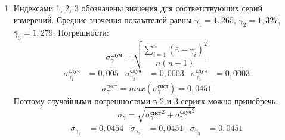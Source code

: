 \documentclass[a4paper]{article}
\begin{document}
\begin{enumerate}
\item Индексами 1, 2, 3 обозначены значения для соответствующих серий измерений. Средние значения показателей равны $\bar{\gamma}_1 = 1,265$, $\bar{\gamma}_2 = 1,327$, $\bar{\gamma}_3 = 1,279$. Погрешности:
\begin{equation*}
	\sigma_\gamma^{\text{случ}} = \sqrt{\frac{\sum_{i=1}^{n}(\bar{\gamma} - \gamma_i)^2}{n(n-1)}}
\end{equation*}
\begin{align}
    \sigma_{\gamma_1}^{\text{случ}} &= 0,005 & \sigma_{\gamma_2}^{\text{случ}} &= 0,0003 & \sigma_{\gamma_3}^{\text{случ}} &= 0,0003
\end{align}
\begin{equation*}
	\sigma_\gamma^{\text{сист}} = max(\sigma_\gamma^{\text{сист}}) = 0,0451
\end{equation*}
Поэтому случайными погрешностями в 2 и 3 сериях можно принебречь.
\begin{equation*}
	\sigma_\gamma = \sqrt{{\sigma_\gamma^{\text{сист}}}^2 + {\sigma_\gamma^{\text{случ}}}^2}
\end{equation*}
\begin{align}
    \sigma_{\gamma_1} &= 0,0454 & \sigma_{\gamma_2} &= 0,0451 & \sigma_{\gamma_3} &= 0,0451
\end{align}


\end{enumerate}
\end{document}
